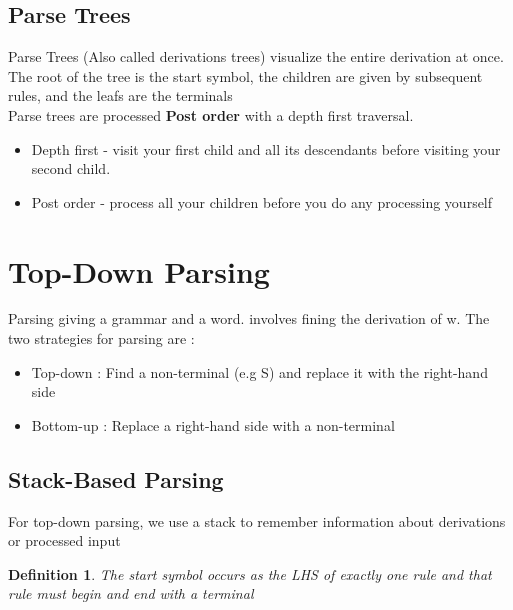 \documentclass{article}
\newtheorem{definition}[theorem]{Definition}
\begin{document}
\subsection{Parse Trees}
Parse Trees (Also called derivations trees) visualize the entire derivation at once. 
The root of the tree is the start symbol, the children are given by subsequent rules, and the leafs are the terminals\\

Parse trees are processed \textbf{Post order} with a depth first traversal. 

\begin{itemize}
\item Depth first - visit your first child and all its descendants before visiting your second child. 
\item Post order - process all your children before you do any processing yourself
\end{itemize}

\section{Top-Down Parsing}
Parsing giving a grammar and a word. involves fining the derivation of w. The two strategies for parsing are : 
\begin{itemize}
\item Top-down : Find a non-terminal (e.g S) and replace it with the right-hand side 
\item Bottom-up : Replace a right-hand side with a non-terminal 
\end{itemize} 

\subsection*{Stack-Based Parsing}
For top-down parsing, we use a stack to remember information about derivations or processed input

\begin{definition}
The start symbol occurs as the LHS of exactly one rule
and that rule must begin and end with a terminal
\end{definition}
\end{document}
